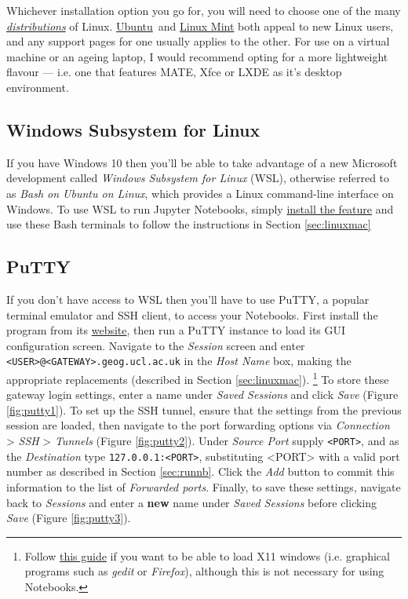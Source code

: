 \documentclass[a4paper]{article}
\begin{document}
Whichever installation option you go for, you will need to choose one of the many \emph{\href{http://distrowatch.com/dwres.php?resource=major}{distributions}} of Linux. \href{https://www.ubuntu.com/download}{Ubuntu}~and \href{https://linuxmint.com/}{Linux Mint} both appeal to new Linux users, and any support pages for one usually applies to the other.
For use on a virtual machine or an ageing laptop, I would recommend opting for a more lightweight flavour --- i.e. one that features MATE, Xfce or LXDE as it's desktop environment.

\subsection{Windows Subsystem for Linux}
\label{sec:wsl}
If you have Windows 10 then you'll be able to take advantage of a new Microsoft development called \emph{Windows Subsystem for Linux} (WSL), otherwise referred to as \emph{Bash on Ubuntu on Linux}, which provides a Linux command-line interface on Windows.
To use WSL to run Jupyter Notebooks, simply \href{https://msdn.microsoft.com/en-gb/commandline/wsl/install_guide}{install the feature} and use these Bash terminals to follow the instructions in Section \ref{sec:linuxmac}

\subsection{PuTTY}
\label{sec:putty}

If you don't have access to WSL then you'll have to use PuTTY, a popular terminal emulator and SSH client, to access your Notebooks. 
First install the program from its \href{http://www.chiark.greenend.org.uk/~sgtatham/putty/latest.html}{website}, then run a PuTTY instance to load its GUI configuration screen. 
Navigate to the \emph{Session} screen and enter \texttt{\textless{}USER\textgreater{}@\textless{}GATEWAY\textgreater{}.geog.ucl.ac.uk} in the \emph{Host Name} box, making the appropriate replacements (described in Section \ref{sec:linuxmac}).
\footnote{Follow \href{http://www.geo.mtu.edu/geoschem/docs/putty_install.html}{this guide} if you want to be able to load X11 windows (i.e. graphical programs such as \emph{gedit} or \emph{Firefox}), although this is not necessary for using Notebooks.}
To store these gateway login settings, enter a name under \emph{Saved Sessions} and click \emph{Save} (Figure \ref{fig:putty1}).
To set up the SSH tunnel, ensure that the settings from the previous session are loaded, then navigate to the port forwarding options via \emph{Connection} \textgreater{} \emph{SSH} \textgreater{} \emph{Tunnels} (Figure \ref{fig:putty2}). 
Under \emph{Source Port} supply \texttt{\textless{}PORT\textgreater{}}, and as the \emph{Destination} type \texttt{127.0.0.1:\textless{}PORT\textgreater{}}, substituting \textless{}PORT\textgreater{} with a valid port number as described in Section \ref{sec:runnb}.
Click the \emph{Add} button to commit this information to the list of \emph{Forwarded ports}.
Finally, to save these settings, navigate back to \emph{Sessions} and enter a \textbf{new} name under \emph{Saved Sessions} before clicking \emph{Save} (Figure \ref{fig:putty3}).
\end{document}
